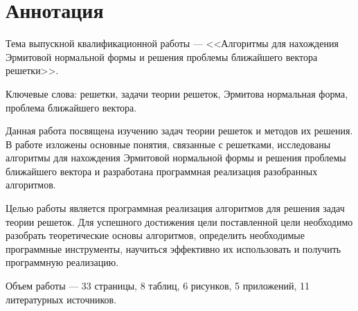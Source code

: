 \newpage
\setcounter{page}{2}

\section*{Аннотация}

Тема выпускной квалификационной работы --- <<Алгоритмы для нахождения Эрмитовой нормальной формы и решения проблемы ближайшего вектора решетки>>.

Ключевые слова: решетки, задачи теории решеток, Эрмитова нормальная форма, проблема ближайшего вектора.

Данная работа посвящена изучению задач теории решеток и методов их решения. В работе изложены основные понятия, связанные с решетками, исследованы алгоритмы для нахождения Эрмитовой нормальной формы и решения проблемы ближайшего вектора и разработана программная реализация разобранных алгоритмов.

Целью работы является программная реализация алгоритмов для решения задач теории решеток. Для успешного достижения цели поставленной цели необходимо разобрать теоретические основы алгоритмов, определить необходимые программные инструменты,  научиться эффективно их использовать и получить программную реализацию.

Объем работы --- 33 страницы, 8 таблиц, 6 рисунков, 5 приложений, 11 литературных источников.

\clearpage